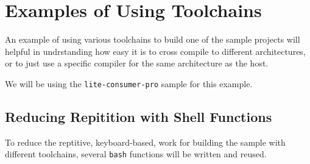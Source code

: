 \section{Examples of Using Toolchains}

An example of using various toolchains to build one of the sample
projects will helpful in undrstanding how easy it is to cross compile
to different architectures, or to just use a specific compiler for the
same architecture as the host.

We will be using the \texttt{lite-consumer-pro} sample for this
example.

\subsection{Reducing Repitition with Shell Functions}

To reduce the reptitive, keyboard-based, work for building the sample
with different toolchains, several \texttt{bash} functions will be
written and reused.

